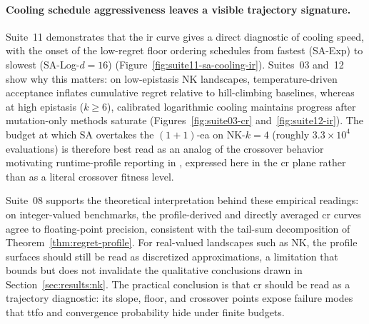 \paragraph{Cooling schedule aggressiveness leaves a visible trajectory
signature.}
Suite~11 demonstrates that the \acrshort{ir} curve gives a direct
diagnostic of cooling speed, with the onset of the low-regret floor
ordering schedules from fastest (SA-Exp) to slowest (SA-Log-$d=16$)
(Figure~\ref{fig:suite11-sa-cooling-ir}). Suites~03 and~12 show why this
matters: on low-epistasis NK landscapes, temperature-driven acceptance
inflates cumulative regret relative to hill-climbing baselines, whereas
at high epistasis ($k \geq 6$), calibrated logarithmic cooling maintains
progress after mutation-only methods saturate
(Figures~\ref{fig:suite03-cr} and~\ref{fig:suite12-ir}). The budget at
which SA overtakes the $(1+1)$-\acrshort{ea} on NK-$k=4$ (roughly
$3.3 \times 10^4$ evaluations) is therefore best read as an analog of
the crossover behavior motivating runtime-profile reporting in
\citet{pinto2018practice}, expressed here in the \acrshort{cr} plane
rather than as a literal crossover fitness level.

Suite~08 supports the theoretical interpretation behind these empirical
readings: on integer-valued benchmarks, the profile-derived and directly
averaged \acrshort{cr} curves agree to floating-point precision, consistent with
the tail-sum decomposition of Theorem~\ref{thm:regret-profile}. For real-valued
landscapes such as NK, the profile surfaces should still be read as discretized
approximations, a limitation that bounds but does not invalidate the qualitative
conclusions drawn in Section~\ref{sec:results:nk}. The practical
conclusion is that
\acrshort{cr} should be read as a trajectory diagnostic: its slope,
floor, and crossover points expose failure modes that \acrshort{ttfo}
and convergence probability hide under finite budgets.

